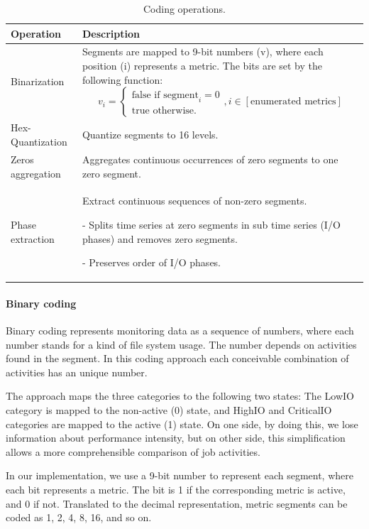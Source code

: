 \documentclass[]{llncs}
\begin{document}
\begin{table}
 \centering
 \begin{tabularx}{\textwidth}{lX}
	 \hline
	 Operation &  Description \\
	 \hline
	 Binarization & Segments are mapped to 9-bit numbers (v), where each position (i) represents a metric. The bits are set by the following function:
	 \vbox{
		\begin{equation}
			v_i = 
			\begin{cases}
				\text{false if segment}_i = 0\\\text{true otherwise.}
			\end{cases}, i \in [\text{enumerated metrics}]
		\end{equation}
	 } \\
	 \hline
	 Hex-Quantization & Quantize segments to 16 levels. \\
	 \hline
	 Zeros aggregation & Aggregates continuous occurrences of zero segments to one zero segment. \\
	 \hline
	 Phase extraction &  Extract continuous sequences of non-zero segments. \par - Splits time series at zero segments in sub time series (I/O phases) and removes zero segments. \par - Preserves order of I/O phases. \\
	 \hline
 \end{tabularx}
 \caption{Coding operations.}
 \label{tab:coding_ops}
\end{table}


\paragraph{Binary coding}
Binary coding represents monitoring data as a sequence of numbers, where each number stands for a kind of file system usage.
The number depends on activities found in the segment.
In this coding approach each conceivable combination of activities has an unique number.

The approach maps the three categories to the following two states: The LowIO category is mapped to the non-active (0) state, and HighIO and CriticalIO categories are mapped to the active (1) state.
On one side, by doing this, we lose information about performance intensity, but on other side, this simplification allows a more comprehensible comparison of job activities.

In our implementation, we use a 9-bit number to represent each segment, where each bit represents a metric.
The bit is 1 if the corresponding metric is active, and 0 if not.
Translated to the decimal representation, metric segments can be coded as 1, 2, 4, 8, 16, and so on.
\end{document}
